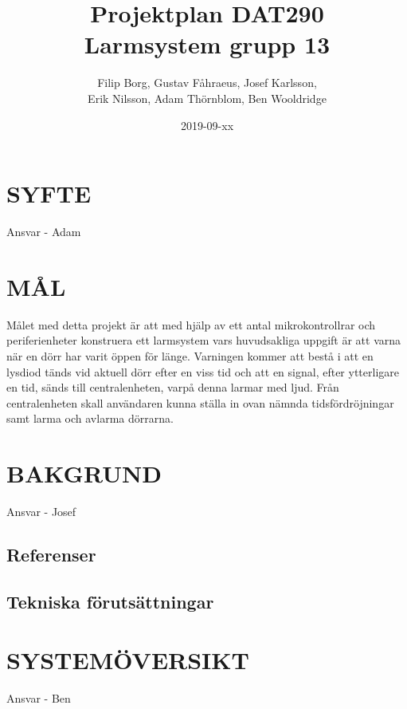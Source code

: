 \documentclass[a4paper]{article}
\title{Projektplan DAT290 \\ \Large Larmsystem grupp 13}
\author{Filip Borg, Gustav Fåhraeus, Josef Karlsson,\\
            Erik Nilsson, Adam Thörnblom, Ben Wooldridge}
\date{2019-09-xx}
\begin{document}
\maketitle
{}
\newpage

\tableofcontents
\newpage



\section{SYFTE}
\label{sec:syfte}

Ansvar - Adam

\section{MÅL}
\label{sec:mål}

Målet med detta projekt är att med hjälp av ett antal mikrokontrollrar och periferienheter konstruera ett larmsystem vars huvudsakliga uppgift är att varna när en dörr har varit öppen för länge. Varningen kommer att bestå i att en lysdiod tänds vid aktuell dörr efter en viss tid och att en signal, efter ytterligare en tid, sänds till centralenheten, varpå denna larmar med ljud. Från centralenheten skall användaren kunna ställa in ovan nämnda tidsfördröjningar samt larma och avlarma dörrarna.

\section{BAKGRUND}
\label{sec:bakgrund}

Ansvar - Josef

\subsection{Referenser}
\label{sec:referenser}



\subsection{Tekniska förutsättningar}
\label{sec:tekniskaf}



\section{SYSTEMÖVERSIKT}
\label{sec:systemö}

Ansvar - Ben
\end{document}
